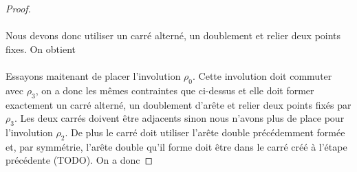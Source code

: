 \begin{proof}
  \paragraph{}
  Nous devons donc utiliser un carré alterné, un doublement et relier deux points fixes. On obtient

  \begin{figure}[H]
    \begin{center}
      \caption{}
    \end{center}
  \end{figure}


  \paragraph{}
  Essayons maitenant de placer l'involution $\rho_0$. Cette involution doit commuter avec $\rho_3$, on a donc les mêmes contraintes que ci-dessus et elle doit former exactement un carré alterné, un doublement d'arête et relier deux points fixés par $\rho_3$. Les deux carrés doivent être adjacents sinon nous n'avons plus de place pour l'involution $\rho_2$. De plus le carré doit utiliser l'arête double précédemment formée et, par symmétrie, l'arête double qu'il forme doit être dans le carré créé à l'étape précédente (TODO). On a donc


\end{proof}
